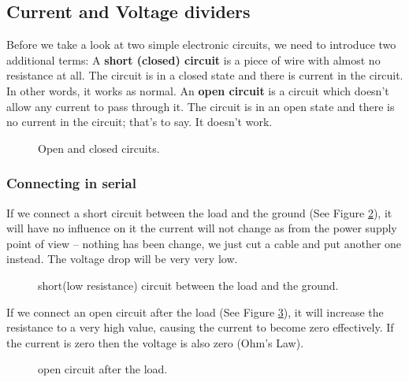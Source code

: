 \subsection{Current and Voltage dividers}
Before we take a look at two simple electronic circuits, we need to introduce two additional terms:
A \textbf{short (closed) circuit} is a piece of wire with almost no resistance at all. The circuit is in a closed state and there is current in the circuit. In other words, it works as normal.
An \textbf{open circuit} is a circuit which doesn't allow any current to pass through it. The circuit is in an open state and there is no current in the circuit; that’s to say. It doesn’t work.
\begin{figure}[h]
    \centering
    
    \caption{Open and closed circuits.} \label{fig:open_closed_circuits}
\end{figure}
\subsubsection{Connecting in serial}
If we connect a short circuit between the load and the ground (See Figure \ref{fig:circuit1}), it will have no influence on it the current will not change as from the power supply point of view – nothing has been change, we just cut a cable and put another one instead. The voltage drop will be very very low.
\begin{figure}[h]
    \centering
    
    \caption{short(low resistance) circuit between the load and the ground.} \label{fig:circuit1}
\end{figure}
\newline
If we connect an open circuit after the load (See Figure \ref{fig:circuit2}), it will increase the resistance to a very high value, causing the current to become zero effectively. If the current is zero then the voltage is also zero (Ohm’s Law).
\begin{figure}[h]
    \centering
    
    \caption{open circuit after the load.} \label{fig:circuit2}
\end{figure}
